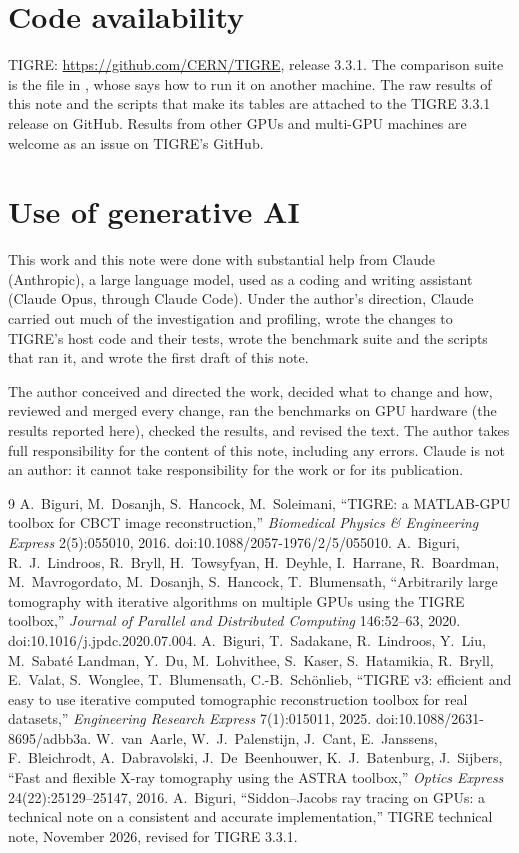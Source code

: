 \documentclass[11pt,a4paper]{article}
\begin{document}
\section*{Code availability}
TIGRE: \url{https://github.com/CERN/TIGRE}, release 3.3.1. The comparison suite is the file
 in , whose  says how to
run it on another machine. The raw results of this note and the scripts that make its tables are attached to the
TIGRE 3.3.1 release on GitHub.
Results from other GPUs and multi-GPU machines are welcome as an issue on TIGRE's GitHub.

\section*{Use of generative AI}
This work and this note were done with substantial help from Claude (Anthropic), a large language model, used
as a coding and writing assistant (Claude Opus, through Claude Code). Under the author's
direction, Claude carried out much of the investigation and profiling, wrote the changes to TIGRE's host code and
their tests, wrote the benchmark suite and the scripts that ran it, and wrote the first draft of this note.

The author conceived and directed the work, decided what to change and how, reviewed and merged every change,
ran the benchmarks on GPU hardware (the results reported here), checked the results, and revised the text. The
author takes full responsibility for the content of this note, including any errors. Claude is not an author: it
cannot take responsibility for the work or for its publication.

\begin{thebibliography}{9}
 A.~Biguri, M.~Dosanjh, S.~Hancock, M.~Soleimani, ``TIGRE: a MATLAB-GPU toolbox for CBCT
image reconstruction,'' \emph{Biomedical Physics \& Engineering Express} 2(5):055010, 2016.
doi:10.1088/2057-1976/2/5/055010.
 A.~Biguri, R.~J.~Lindroos, R.~Bryll, H.~Towsyfyan, H.~Deyhle, I.~Harrane,
R.~Boardman, M.~Mavrogordato, M.~Dosanjh, S.~Hancock, T.~Blumensath, ``Arbitrarily large tomography with
iterative algorithms on multiple GPUs using the TIGRE toolbox,'' \emph{Journal of Parallel and Distributed
Computing} 146:52--63, 2020. doi:10.1016/j.jpdc.2020.07.004.
 A.~Biguri, T.~Sadakane, R.~Lindroos, Y.~Liu, M.~Sabat\'e Landman, Y.~Du, M.~Lohvithee,
S.~Kaser, S.~Hatamikia, R.~Bryll, E.~Valat, S.~Wonglee, T.~Blumensath, C.-B.~Sch\"onlieb, ``TIGRE v3: efficient
and easy to use iterative computed tomographic reconstruction toolbox for real datasets,''
\emph{Engineering Research Express} 7(1):015011, 2025. doi:10.1088/2631-8695/adbb3a.
 W.~van~Aarle, W.~J.~Palenstijn, J.~Cant, E.~Janssens, F.~Bleichrodt, A.~Dabravolski,
J.~De~Beenhouwer, K.~J.~Batenburg, J.~Sijbers, ``Fast and flexible X-ray tomography using the ASTRA toolbox,''
\emph{Optics Express} 24(22):25129--25147, 2016.
 A.~Biguri, ``Siddon--Jacobs ray tracing on GPUs: a technical note on a consistent and
accurate implementation,'' TIGRE technical note, November 2026, revised for TIGRE 3.3.1.
\end{thebibliography}
\end{document}
